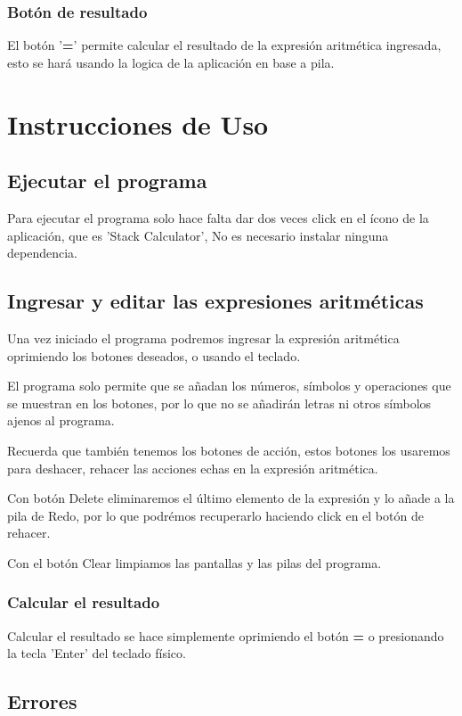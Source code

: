 \documentclass[a4paper,12pt]{article}
\begin{document}
\subsubsection{Botón de resultado}
El botón '\textbf{=}' permite calcular el resultado de la expresión aritmética ingresada, esto se hará usando la logica de la aplicación en base a pila.

\section{Instrucciones de Uso}
\subsection{Ejecutar el programa}
Para ejecutar el programa solo hace falta dar dos veces click en el ícono de la aplicación, que es 'Stack Calculator', No es necesario instalar ninguna dependencia.

\subsection{Ingresar y editar las expresiones aritméticas}
Una vez iniciado el programa podremos ingresar la expresión aritmética oprimiendo los botones deseados, o usando el teclado.

El programa solo permite que se añadan los números, símbolos y operaciones que se muestran en los botones, por lo que no se añadirán letras ni otros símbolos ajenos al programa.

Recuerda que también tenemos los botones de acción, estos botones los usaremos para deshacer, rehacer las acciones echas en la expresión aritmética.

Con botón Delete eliminaremos el último elemento de la expresión y lo añade a la pila de Redo, por lo que podrémos recuperarlo haciendo click en el botón de rehacer. 

Con el botón Clear limpiamos las pantallas y las pilas del programa.

\subsubsection{Calcular el resultado}
Calcular el resultado se hace simplemente oprimiendo el botón \textbf{=} o presionando la tecla 'Enter' del teclado físico.


\subsection{Errores}
\end{document}
